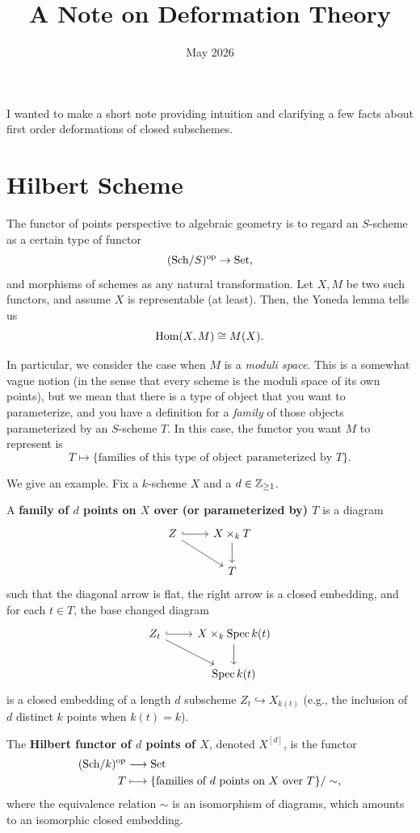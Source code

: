 \documentclass[12pt]{article}
\title{A Note on Deformation Theory}
\author{}
\date{May 2026}
\begin{document}
\maketitle

I wanted to make a short note providing intuition and clarifying a few facts about first order deformations of closed subschemes.

\section{Hilbert Scheme}

The functor of points perspective to algebraic geometry is to regard an $S$-scheme as a certain type of functor
\[(\mathrm{Sch}/S)^{\mathrm{op}} \to \mathrm{Set},\]
and morphisms of schemes as any natural transformation. Let $X,M$ be two such functors, and assume $X$ is representable (at least). Then, the Yoneda lemma tells us
\[\mathrm{Hom}(X,M) \cong M(X).\]

In particular, we consider the case when $M$ is a \textit{moduli space}. This is a somewhat vague notion (in the sense that every scheme is the moduli space of its own points), but we mean that there is a type of object that you want to parameterize, and you have a definition for a \textit{family} of those objects parameterized by an $S$-scheme $T$. In this case, the functor you want $M$ to represent is
\[T \mapsto \{\text{families of this type of object parameterized by $T$}\}.\]

We give an example. Fix a $k$-scheme $X$ and a $d\in \mathbb{Z}_{\geq 1}$.

\begin{defn}
    A \textbf{family of $d$ points on $X$ over (or parameterized by) $T$} is a diagram
    \[\begin{tikzcd}
        Z \rar[hook] \ar[dr] & X\times_k T\dar\\
        & T
    \end{tikzcd}\]
    such that the diagonal arrow is flat, the right arrow is a closed embedding, and for each $t\in T$, the base changed diagram
    \[\begin{tikzcd}
        Z_t \rar[hook] \ar[dr] & X\times_k \Spec k(t) \dar\\
        & \Spec k(t)
    \end{tikzcd}\]
    is a closed embedding of a length $d$ subscheme $Z_t\hookrightarrow X_{k(t)}$ (e.g., the inclusion of $d$ distinct $k$ points when $k(t)=k$). 
\end{defn}

\begin{defn}
    The \textbf{Hilbert functor of $d$ points of $X$}, denoted $X^{[d]}$, is the functor
    \begin{align*}
        (\mathrm{Sch}/k)^{\mathrm{op}} &\longrightarrow \mathrm{Set}\\
        T &\longmapsto \{\text{families of $d$ points on $X$ over $T$}\}/\sim,
    \end{align*}
    where the equivalence relation $\sim$ is an isomorphism of diagrams, which amounts to an isomorphic closed embedding. 
\end{defn}
\end{document}
